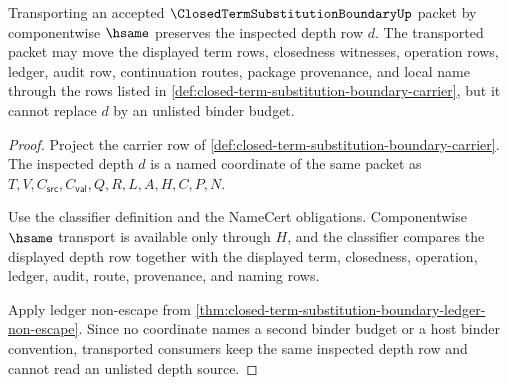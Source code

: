 \begin{theorem}
\label{thm:closed-term-substitution-boundary-depth-row-stability}
Transporting an accepted $\ClosedTermSubstitutionBoundaryUp$ packet by componentwise $\hsame$ preserves the inspected depth row $d$. The transported packet may move the displayed term rows, closedness witnesses, operation rows, ledger, audit row, continuation routes, package provenance, and local name through the rows listed in \autoref{def:closed-term-substitution-boundary-carrier}, but it cannot replace $d$ by an unlisted binder budget.
\end{theorem}
\begin{proof}
Project the carrier row of \autoref{def:closed-term-substitution-boundary-carrier}. The inspected depth $d$ is a named coordinate of the same packet as $T,V,C_{\mathsf{src}},C_{\mathsf{val}},Q,R,L,A,H,C,P,N$.

Use the classifier definition and the NameCert obligations. Componentwise $\hsame$ transport is available only through $H$, and the classifier compares the displayed depth row together with the displayed term, closedness, operation, ledger, audit, route, provenance, and naming rows.

Apply ledger non-escape from \autoref{thm:closed-term-substitution-boundary-ledger-non-escape}. Since no coordinate names a second binder budget or a host binder convention, transported consumers keep the same inspected depth row and cannot read an unlisted depth source.
\end{proof}

